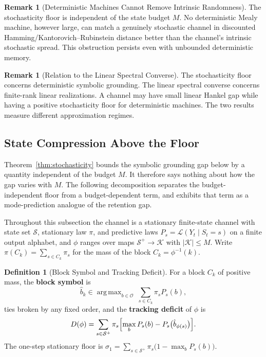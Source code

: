 \documentclass[12pt]{article}
\theoremstyle{definition}
\newtheorem{definition}[theorem]{Definition}
\newtheorem{remark}[theorem]{Remark}
\DeclareMathOperator*{\argmax}{arg\,max}
\newcommand{\Splus}{\mathcal S^{+}}
\begin{document}
\begin{remark}[Deterministic Machines Cannot Remove Intrinsic Randomness]
\label{rem:stochasticity-meaning}
The stochasticity floor is independent of the state budget $M$.  No
deterministic Mealy machine, however large, can match a genuinely stochastic
channel in discounted Hamming/Kantorovich--Rubinstein distance better than the
channel's intrinsic stochastic spread.  This obstruction persists even with
unbounded deterministic memory.
\end{remark}

\begin{remark}[Relation to the Linear Spectral Converse]
\label{rem:stochasticity-vs-linear}
The stochasticity floor concerns deterministic symbolic grounding.  The linear
spectral converse concerns finite-rank linear realizations.  A channel may have
small linear Hankel gap while having a positive stochasticity floor for
deterministic machines.  The two results measure different approximation
regimes.
\end{remark}

\subsection{State Compression Above the Floor}
\label{subsec:grounding-tracking}

Theorem~\ref{thm:stochasticity} bounds the symbolic grounding gap below by a
quantity independent of the budget $M$.  It therefore says nothing about how
the gap varies with $M$.  The following decomposition separates the
budget-independent floor from a budget-dependent term, and exhibits that term
as a mode-prediction analogue of the retention gap.

Throughout this subsection the channel is a stationary finite-state channel
with state set $\mathcal S$, stationary law $\pi$, and predictive laws
$P_s=\mathcal L(Y_t\mid S_t=s)$ on a finite output alphabet, and $\phi$ ranges
over maps $\Splus\to\mathcal K$ with $|\mathcal K|\le M$.  Write
$\pi(C_k)=\sum_{s\in C_k}\pi_s$ for the mass of the block $C_k=\phi^{-1}(k)$.

\begin{definition}[Block Symbol and Tracking Deficit]
\label{def:tracking-deficit}
For a block $C_k$ of positive mass, the \textbf{block symbol} is
\[
\hat b_k
\in
\argmax_{b\in\mathcal O}\ \sum_{s\in C_k}\pi_s P_s(b),
\]
ties broken by any fixed order, and the \textbf{tracking deficit} of $\phi$ is
\[
D(\phi)
=
\sum_{s\in\Splus}\pi_s
\Bigl[
\max_{b}P_s(b)-P_s\bigl(\hat b_{\phi(s)}\bigr)
\Bigr].
\]
The one-step stationary floor is
$\sigma_1=\sum_{s\in\Splus}\pi_s\bigl(1-\max_bP_s(b)\bigr)$.
\end{definition}
\end{document}
